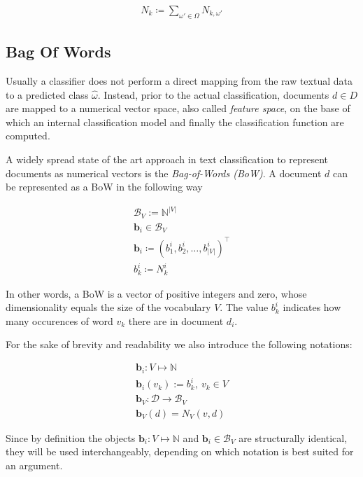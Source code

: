 \begin{eqnarray*}
N_k \coloneqq \sum_{\omega'\in \Omega} N_{k,\omega'} 
\end{eqnarray*}

\subsection{Bag Of Words}

Usually a classifier does not perform a direct mapping from
the raw textual data to a predicted class $\hat{\omega}$. Instead, prior to the actual
classification, documents $d \in D$ are mapped to a numerical vector
space, also called \emph{feature space}, on the base of which an internal 
classification model and finally the classification function are computed.

A widely spread state of the art approach in text classification to represent
documents as numerical vectors is the \emph{Bag-of-Words (BoW)}.
A document $d$ can be represented as a BoW in the following way

\begin{eqnarray*}
	\mathcal{B}_V := \mathbb{N}^{|V|} \\
	\mathbf{b}_i \in \mathcal{B}_V \\
	\mathbf{b}_i \coloneqq (b_1^i, b_2^i, \ldots, b_{|V|}^i)^\intercal \\
	b_k^i \coloneqq N_k^i
\end{eqnarray*}
	
In other words, a BoW is a vector of positive integers and zero, whose
dimensionality equals the size of the vocabulary $V$. The value $b_k^i$
indicates how many occurences of word $v_k$ there are in document
$d_i$. 

For the sake of brevity and readability we also introduce the following
notations:

\begin{eqnarray*}
	\mathbf{b}_i: V \mapsto \mathbb{N} \\
	\mathbf{b}_i(v_k) := b_k^i,\ v_k \in V \\
	\mathbf{b}_V: \mathcal{D} \to \mathcal{B}_V \\
	\mathbf{b}_V(d) = N_V(v,d) 
\end{eqnarray*}

Since by definition the objects $\mathbf{b}_i: V \mapsto \mathbb{N}$ and
$\mathbf{b}_i \in \mathcal{B}_V$ are structurally identical, they will be used
interchangeably, depending on which notation is best suited for an argument. 

